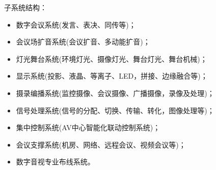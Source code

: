 \documentclass[UTF8,a4paper,AutoFakeBold,AutoFakeSlant]{ctexart}
\begin{document}
子系统结构：
\begin{itemize}
	\item 数字会议系统(发言、表决、同传等)；
	\item 会议场扩音系统(会议扩音、多动能扩音)；
	\item 灯光舞台系统(环境灯光、摄像灯光、舞台灯光、舞台机械)；
	\item 显示系统(投影、液晶、等离子、LED，拼接、边缘融合等)；
	\item 摄录编播系统(监控摄像、会议摄像、广播摄像，录像及处理)；
	\item 信号处理系统(信号的分配、切换、传输、转化，图像处理等)；
	\item 集中控制系统(AV中心智能化联动控制系统)；
	\item 会议支撑系统(机房、网络、远程会议、视频会议等)；
	\item 数字音视专业布线系统。
\end{itemize}















% 
% 
% 
\end{document}

